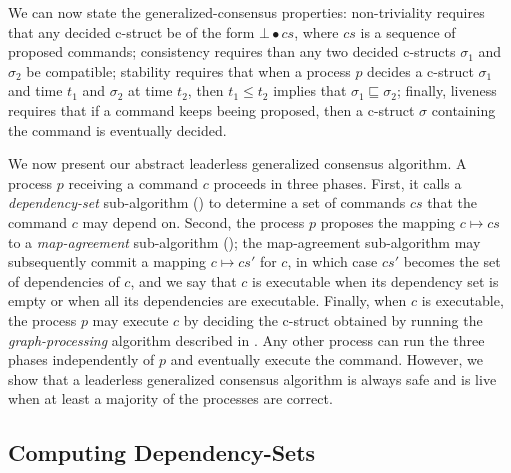 We can now state the generalized-consensus properties: non-triviality requires that any decided c-struct be of the form $\bot\bullet cs$, where $cs$ is a sequence of proposed commands; consistency requires than any two decided c-structs $\sigma_1$ and $\sigma_2$ be compatible; stability requires that when a process $p$ decides a c-struct $\sigma_1$ and time $t_1$ and $\sigma_2$ at time $t_2$, then $t_1 \leq t_2$ implies that $\sigma_1\sqsubseteq \sigma_2$; finally, liveness requires that
if a command keeps beeing proposed, then a c-struct $\sigma$ containing the command is eventually decided.


We now present our abstract leaderless generalized consensus algorithm.
A process $p$ receiving a command $c$ proceeds in three phases. First, it calls a \textit{dependency-set} sub-algorithm () to determine a set of commands $cs$ that the command $c$ may depend on. Second, the process $p$ proposes the mapping  $c\mapsto cs$ to a \textit{map-agreement} sub-algorithm (); the map-agreement sub-algorithm may subsequently commit a mapping $c\mapsto cs'$ for $c$, in which case $cs'$ becomes the set of dependencies of $c$, and we say that $c$ is executable when its dependency set is empty or when all its dependencies are executable. 
Finally, when $c$ is executable, the process $p$ may execute $c$ by deciding the c-struct obtained by running the \emph{graph-processing} algorithm described in .
Any other process can run the three phases independently of $p$ and eventually execute the command.
However, we show that a leaderless  generalized consensus algorithm is always safe and is live when at least a majority of the processes are correct.



\subsection{Computing Dependency-Sets}
\label{dep-algo}

